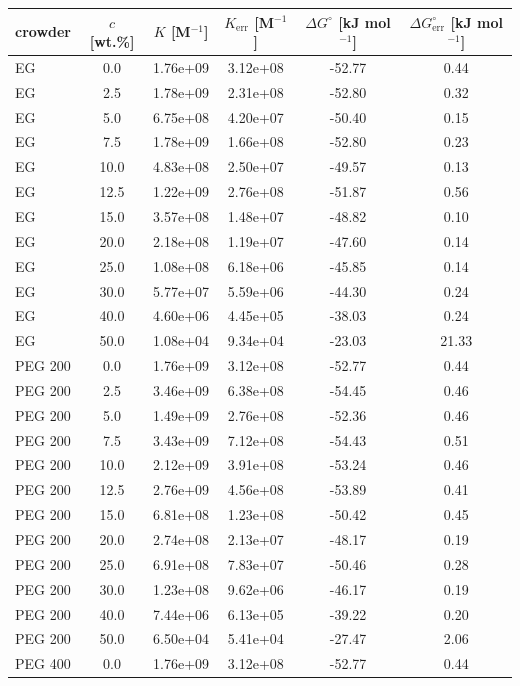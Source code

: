 \begin{tabular}{lccccc}
\toprule
crowder & $c$ [wt.\%] & $K$ [M$^{-1}$] & $K_{\mathrm{err}}$ [M$^{-1}$] & $\Delta G^{\circ}$ [kJ mol$^{-1}$] & $\Delta G^{\circ}_{\mathrm{err}}$ [kJ mol$^{-1}$] \\
\midrule
EG & 0.0 & 1.76e+09 & 3.12e+08 & -52.77 & 0.44 \\
EG & 2.5 & 1.78e+09 & 2.31e+08 & -52.80 & 0.32 \\
EG & 5.0 & 6.75e+08 & 4.20e+07 & -50.40 & 0.15 \\
EG & 7.5 & 1.78e+09 & 1.66e+08 & -52.80 & 0.23 \\
EG & 10.0 & 4.83e+08 & 2.50e+07 & -49.57 & 0.13 \\
EG & 12.5 & 1.22e+09 & 2.76e+08 & -51.87 & 0.56 \\
EG & 15.0 & 3.57e+08 & 1.48e+07 & -48.82 & 0.10 \\
EG & 20.0 & 2.18e+08 & 1.19e+07 & -47.60 & 0.14 \\
EG & 25.0 & 1.08e+08 & 6.18e+06 & -45.85 & 0.14 \\
EG & 30.0 & 5.77e+07 & 5.59e+06 & -44.30 & 0.24 \\
EG & 40.0 & 4.60e+06 & 4.45e+05 & -38.03 & 0.24 \\
EG & 50.0 & 1.08e+04 & 9.34e+04 & -23.03 & 21.33 \\
PEG 200 & 0.0 & 1.76e+09 & 3.12e+08 & -52.77 & 0.44 \\
PEG 200 & 2.5 & 3.46e+09 & 6.38e+08 & -54.45 & 0.46 \\
PEG 200 & 5.0 & 1.49e+09 & 2.76e+08 & -52.36 & 0.46 \\
PEG 200 & 7.5 & 3.43e+09 & 7.12e+08 & -54.43 & 0.51 \\
PEG 200 & 10.0 & 2.12e+09 & 3.91e+08 & -53.24 & 0.46 \\
PEG 200 & 12.5 & 2.76e+09 & 4.56e+08 & -53.89 & 0.41 \\
PEG 200 & 15.0 & 6.81e+08 & 1.23e+08 & -50.42 & 0.45 \\
PEG 200 & 20.0 & 2.74e+08 & 2.13e+07 & -48.17 & 0.19 \\
PEG 200 & 25.0 & 6.91e+08 & 7.83e+07 & -50.46 & 0.28 \\
PEG 200 & 30.0 & 1.23e+08 & 9.62e+06 & -46.17 & 0.19 \\
PEG 200 & 40.0 & 7.44e+06 & 6.13e+05 & -39.22 & 0.20 \\
PEG 200 & 50.0 & 6.50e+04 & 5.41e+04 & -27.47 & 2.06 \\
PEG 400 & 0.0 & 1.76e+09 & 3.12e+08 & -52.77 & 0.44 \\

\end{tabular}
